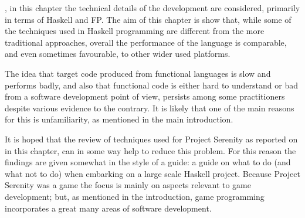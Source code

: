 
, in this chapter the technical details of the development are considered, primarily in terms of Haskell and FP. The aim of this chapter is show that, while some of the techniques used in Haskell programming are different from the more traditional approaches, overall the performance of the language is comparable, and even sometimes favourable, to other wider used platforms.

The idea that target code produced from functional languages is slow and performs badly, and also that functional code is either hard to understand or bad from a software development point of view, persists among some practitioners despite various evidence to the contrary.\cite{roundy2005darcs} It is likely that one of the main reasons for this is unfamiliarity, as mentioned in the main introduction.

It is hoped that the review of techniques used for Project Serenity as reported on in this chapter, can in some way help to reduce this problem. For this reason the findings are given somewhat in the style of a guide: a guide on what to do (and what not to do) when embarking on a large scale Haskell project. Because Project Serenity was a game the focus is mainly on aspects relevant to game development; but, as mentioned in the introduction, game programming incorporates a great many areas of software development.